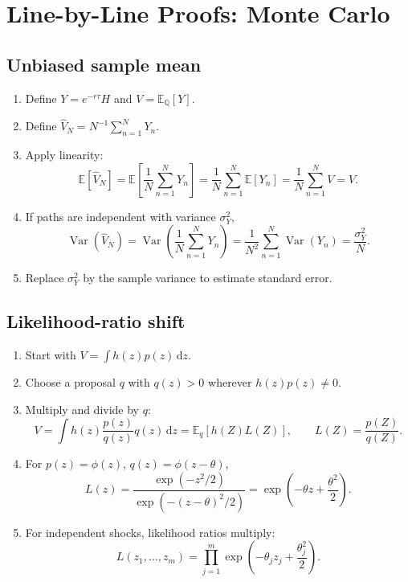 \documentclass[11pt,oneside]{book}
\theoremstyle{definition}
\newenvironment{proofsteps}
{\begin{enumerate}[label=\textbf{Line \arabic*.}, itemsep=0.35em]}
{\end{enumerate}}
\newcommand{\E}{\mathbb{E}}
\newcommand{\Q}{\mathbb{Q}}
\newcommand{\Var}{\operatorname{Var}}
\newcommand{\dd}{\,\mathrm{d}}
\begin{document}
\chapter{Line-by-Line Proofs: Monte Carlo}

\section{Unbiased sample mean}
\begin{proofsteps}
\item Define \(Y=e^{-r\tau}H\) and \(V=\E_\Q[Y]\).
\item Define \(\widehat V_N=N^{-1}\sum_{n=1}^N Y_n\).
\item Apply linearity:
\[
\E[\widehat V_N]
=\E\!\left[\frac1N\sum_{n=1}^N Y_n\right]
=\frac1N\sum_{n=1}^N\E[Y_n]
=\frac1N\sum_{n=1}^N V
=V.
\]
\item If paths are independent with variance \(\sigma_Y^2\),
\[
\Var(\widehat V_N)
=\Var\!\left(\frac1N\sum_{n=1}^N Y_n\right)
=\frac1{N^2}\sum_{n=1}^N\Var(Y_n)
=\frac{\sigma_Y^2}{N}.
\]
\item Replace \(\sigma_Y^2\) by the sample variance to estimate standard error.
\end{proofsteps}

\section{Likelihood-ratio shift}
\begin{proofsteps}
\item Start with \(V=\int h(z)p(z)\dd z\).
\item Choose a proposal \(q\) with \(q(z)>0\) wherever \(h(z)p(z)\neq 0\).
\item Multiply and divide by \(q\):
\[
V=\int h(z)\frac{p(z)}{q(z)}q(z)\dd z
=\E_q[h(Z)L(Z)],\qquad L(Z)=\frac{p(Z)}{q(Z)}.
\]
\item For \(p(z)=\phi(z)\), \(q(z)=\phi(z-\theta)\),
\[
L(z)
=\frac{\exp(-z^2/2)}{\exp(-(z-\theta)^2/2)}
=\exp\!\left(-\theta z+\frac{\theta^2}{2}\right).
\]
\item For independent shocks, likelihood ratios multiply:
\[
L(z_1,\ldots,z_m)
=\prod_{j=1}^m\exp\!\left(-\theta_j z_j+\frac{\theta_j^2}{2}\right).
\]
\end{proofsteps}
\end{document}
